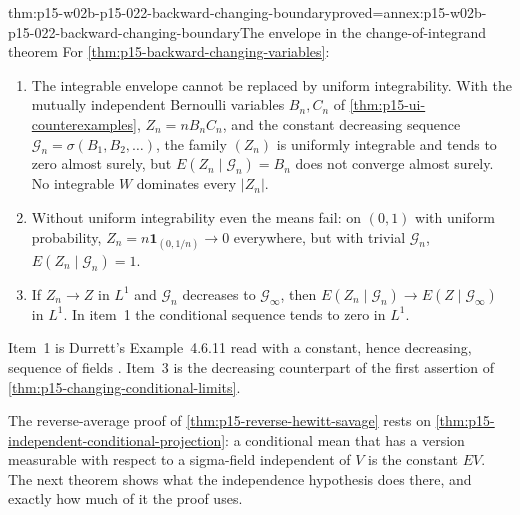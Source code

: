 \begin{hbtheorem}{thm:p15-w02b-p15-022-backward-changing-boundary}{proved=annex:p15-w02b-p15-022-backward-changing-boundary}{The envelope in the change-of-integrand theorem}
For \cref{thm:p15-backward-changing-variables}:
\begin{enumerate}
\item The integrable envelope cannot be replaced by uniform integrability.
      With the mutually independent Bernoulli variables \(B_n,C_n\) of
      \cref{thm:p15-ui-counterexamples}, \(Z_n=nB_nC_n\), and the constant
      decreasing sequence \(\mathcal G_n=\sigma(B_1,B_2,\ldots)\), the family
      \((Z_n)\) is uniformly integrable and tends to zero almost surely, but
      \(E(Z_n\mid\mathcal G_n)=B_n\) does not converge almost surely. No
      integrable \(W\) dominates every \(|Z_n|\).
\item Without uniform integrability even the means fail: on \((0,1)\) with
      uniform probability, \(Z_n=n\mathbf1_{(0,1/n)}\to0\) everywhere,
      but with trivial \(\mathcal G_n\), \(E(Z_n\mid\mathcal G_n)=1\).
\item If \(Z_n\to Z\) in \(L^1\) and \(\mathcal G_n\) decreases to
      \(\mathcal G_\infty\), then
      \(E(Z_n\mid\mathcal G_n)\to E(Z\mid\mathcal G_\infty)\) in \(L^1\).
      In item~1 the conditional sequence tends to zero in \(L^1\).
\end{enumerate}
\end{hbtheorem}

Item~1 is Durrett's Example~4.6.11 read with a constant, hence decreasing,
sequence of fields \cite[p.~248]{DurrettPTEAuthor2019}. Item~3 is the
decreasing counterpart of the first assertion of
\cref{thm:p15-changing-conditional-limits}.

The reverse-average proof of \cref{thm:p15-reverse-hewitt-savage} rests on
\cref{thm:p15-independent-conditional-projection}: a conditional mean that
has a version measurable with respect to a sigma-field independent of \(V\)
is the constant \(EV\). The next theorem shows what the independence
hypothesis does there, and exactly how much of it the proof uses.

